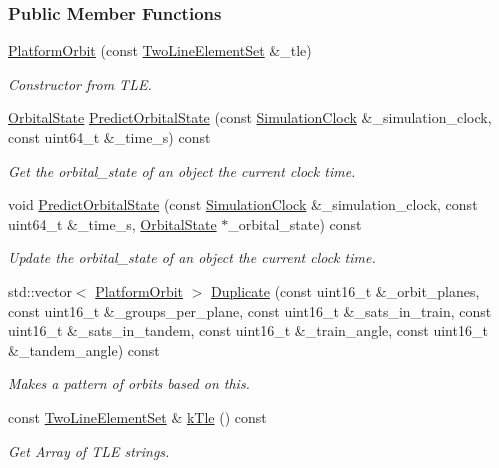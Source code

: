 \subsubsection*{Public Member Functions}
\begin{DoxyCompactItemize}
\item 
\hyperlink{classosse_1_1collaborate_1_1_platform_orbit_a7883ef54a0b5d13497fd6d21c3bd2ebf}{Platform\+Orbit} (const \hyperlink{classosse_1_1collaborate_1_1_platform_orbit_aeb5892b2982d26547cead0beebc81fe0}{Two\+Line\+Element\+Set} \&\+\_\+tle)
\begin{DoxyCompactList}\small\item\em Constructor from T\+LE. \end{DoxyCompactList}\item 
\hyperlink{classosse_1_1collaborate_1_1_orbital_state}{Orbital\+State} \hyperlink{classosse_1_1collaborate_1_1_platform_orbit_a6741aa8faec9968fd8353214d2022648}{Predict\+Orbital\+State} (const \hyperlink{classosse_1_1collaborate_1_1_simulation_clock}{Simulation\+Clock} \&\+\_\+simulation\+\_\+clock, const uint64\+\_\+t \&\+\_\+time\+\_\+s) const
\begin{DoxyCompactList}\small\item\em Get the orbital\+\_\+state of an object the current clock time. \end{DoxyCompactList}\item 
void \hyperlink{classosse_1_1collaborate_1_1_platform_orbit_a2b97a4133cb7d82d3ea62a3470f87d72}{Predict\+Orbital\+State} (const \hyperlink{classosse_1_1collaborate_1_1_simulation_clock}{Simulation\+Clock} \&\+\_\+simulation\+\_\+clock, const uint64\+\_\+t \&\+\_\+time\+\_\+s, \hyperlink{classosse_1_1collaborate_1_1_orbital_state}{Orbital\+State} $\ast$\+\_\+orbital\+\_\+state) const
\begin{DoxyCompactList}\small\item\em Update the orbital\+\_\+state of an object the current clock time. \end{DoxyCompactList}\item 
std\+::vector$<$ \hyperlink{classosse_1_1collaborate_1_1_platform_orbit}{Platform\+Orbit} $>$ \hyperlink{classosse_1_1collaborate_1_1_platform_orbit_a7c11526ed7a47023520c8fbf3605b4c4}{Duplicate} (const uint16\+\_\+t \&\+\_\+orbit\+\_\+planes, const uint16\+\_\+t \&\+\_\+groups\+\_\+per\+\_\+plane, const uint16\+\_\+t \&\+\_\+sats\+\_\+in\+\_\+train, const uint16\+\_\+t \&\+\_\+sats\+\_\+in\+\_\+tandem, const uint16\+\_\+t \&\+\_\+train\+\_\+angle, const uint16\+\_\+t \&\+\_\+tandem\+\_\+angle) const
\begin{DoxyCompactList}\small\item\em Makes a pattern of orbits based on this. \end{DoxyCompactList}\item 
const \hyperlink{classosse_1_1collaborate_1_1_platform_orbit_aeb5892b2982d26547cead0beebc81fe0}{Two\+Line\+Element\+Set} \& \hyperlink{classosse_1_1collaborate_1_1_platform_orbit_ae0b1dac3159bb4f278091b73221cad93}{k\+Tle} () const
\begin{DoxyCompactList}\small\item\em Get Array of T\+LE strings. \end{DoxyCompactList}\end{DoxyCompactItemize}
